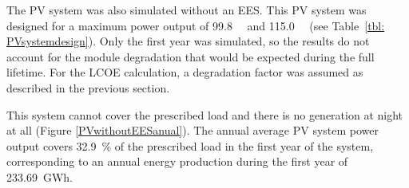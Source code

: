 The PV system was also simulated without an EES. This PV system was designed for a maximum power output of \SI{99.8}{\mega\wattsac} and \SI{115.0}{\mega\wattsdc} (see Table~\ref{tbl: PVsystemdesign}). Only the first year was simulated, so the results do not account for the module degradation that would be expected during the full lifetime. For the LCOE calculation, a degradation factor was assumed as described in the previous section. 


This system cannot cover the prescribed load and there is no generation at night at all (Figure \ref{PVwithoutEESanual}). The annual average PV system power output covers \SI{32.9}{\percent} of the prescribed load in the first year of the system, corresponding to an annual energy production during the first year of \SI{233.69}{GWh}.


